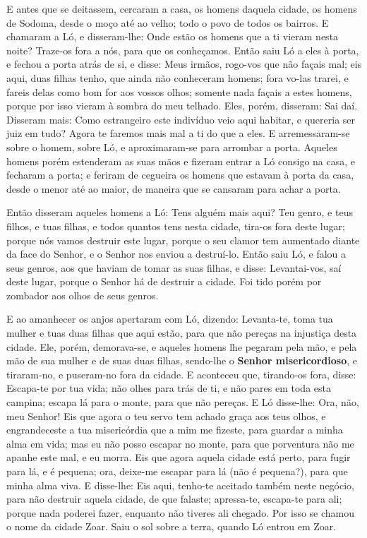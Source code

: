 E antes que se deitassem, cercaram a casa, os homens daquela
cidade, os homens de Sodoma, desde o moço até ao velho; todo o povo
de todos os bairros. E chamaram a Ló, e disseram-lhe: Onde estão
os homens que a ti vieram nesta noite? Traze-os fora a nós, para que
os conheçamos. Então saiu Ló a eles à porta, e fechou a porta
atrás de si, e disse: Meus irmãos, rogo-vos que não façais mal;
eis aqui, duas filhas tenho, que ainda não conheceram homens;
fora vo-las trarei, e fareis delas como bom for aos vossos olhos;
somente nada façais a estes homens, porque por isso vieram à sombra
do meu telhado. Eles, porém, disseram: Sai daí. Disseram mais:
Como estrangeiro este indivíduo veio aqui habitar, e quereria ser
juiz em tudo? Agora te faremos mais mal a ti do que a eles. E
arremessaram-se sobre o homem, sobre Ló, e aproximaram-se para
arrombar a porta. Aqueles homens porém estenderam as suas
mãos e fizeram entrar a Ló consigo na casa, e fecharam a porta;
e feriram de cegueira os homens que estavam à porta da casa,
desde o menor até ao maior, de maneira que se cansaram para achar a
porta.

Então disseram aqueles homens a Ló: Tens alguém mais aqui? Teu
genro, e teus filhos, e tuas filhas, e todos quantos tens nesta
cidade, tira-os fora deste lugar; porque nós vamos destruir
este lugar, porque o seu clamor tem aumentado diante da face do
Senhor, e o Senhor nos enviou a destruí-lo. Então saiu Ló, e
falou a seus genros, aos que haviam de tomar as suas filhas, e
disse: Levantai-vos, saí deste lugar, porque o Senhor há de destruir
a cidade. Foi tido porém por zombador aos olhos de seus genros.

E ao amanhecer os anjos apertaram com Ló, dizendo: Levanta-te,
toma tua mulher e tuas duas filhas que aqui estão, para que não
pereças na injustiça desta cidade. Ele, porém, demorava-se, e
aqueles homens lhe pegaram pela mão, e pela mão de sua mulher e de
suas duas filhas, sendo-lhe o \textbf{Senhor misericordioso}, e
tiraram-no, e puseram-no fora da cidade. E aconteceu que,
tirando-os fora, disse: Escapa-te por tua vida; não olhes para trás
de ti, e não pares em toda esta campina; escapa lá para o monte,
para que não pereças. E Ló disse-lhe: Ora, não, meu Senhor!
Eis que agora o teu servo tem achado graça aos teus olhos, e
engrandeceste a tua misericórdia que a mim me fizeste, para guardar
a minha alma em vida; mas eu não posso escapar no monte, para que
porventura não me apanhe este mal, e eu morra. Eis que agora
aquela cidade está perto, para fugir para lá, e é pequena; ora,
deixe-me escapar para lá (não é pequena?), para que minha alma viva.
E disse-lhe: Eis aqui, tenho-te aceitado também neste
negócio, para não destruir aquela cidade, de que falaste;
apressa-te, escapa-te para ali; porque nada poderei fazer,
enquanto não tiveres ali chegado. Por isso se chamou o nome da
cidade Zoar. Saiu o sol sobre a terra, quando Ló entrou em
Zoar.

